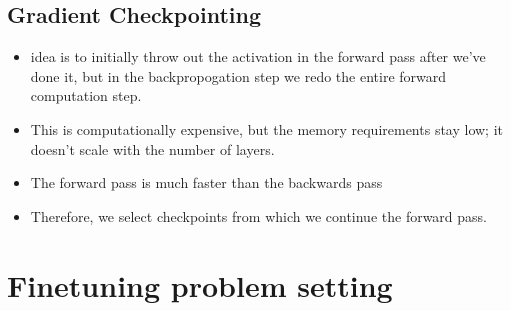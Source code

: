 \documentclass[11pt]{article}
\begin{document}
\subsection{Gradient Checkpointing}

\begin{minipage}[l]{.5\linewidth}
    \begin{figure}[H]
        \centering
    \end{figure}    
\end{minipage}\hfill
\begin{minipage}[r]{.48\linewidth}
    \begin{itemize}
        \item idea is to initially throw out the activation in the forward pass after we've done it, but in the backpropogation step we redo the entire forward computation step.
        \item This is computationally expensive, but the memory requirements stay low; it doesn't scale with the number of layers.
        \item The forward pass is much faster than the backwards pass
        \item Therefore, we select checkpoints from which we continue the forward pass. 
    \end{itemize}
\end{minipage}

\section{Finetuning problem setting}
\end{document}
